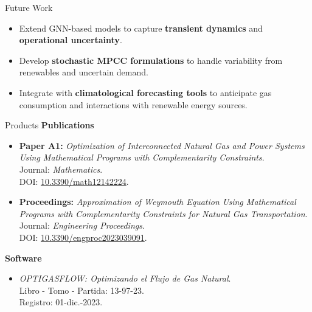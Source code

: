 \documentclass[hyperref={colorlinks,citecolor=blue,linkcolor=blue,urlcolor=blue}]{beamer}
\begin{document}
\begin{frame}{Future Work}
\begin{itemize}
    \justifying
    \item Extend GNN-based models to capture \textbf{transient dynamics} and \textbf{operational uncertainty}.
    \item Develop \textbf{stochastic MPCC formulations} to handle variability from renewables and uncertain demand.
    \item Integrate with \textbf{climatological forecasting tools} to anticipate gas consumption and interactions with renewable energy sources.
\end{itemize}
\end{frame}



\begin{frame}{Products}
\footnotesize
\textbf{Publications}
\begin{itemize}
    \item \textbf{Paper A1:} \emph{Optimization of Interconnected Natural Gas and Power Systems Using Mathematical Programs with Complementarity Constraints}.\\
    Journal: \textit{Mathematics}.\\
    DOI: \href{https://doi.org/10.3390/math12142224}{10.3390/math12142224}.
    
    \item \textbf{Proceedings:} \emph{Approximation of Weymouth Equation Using Mathematical Programs with Complementarity Constraints for Natural Gas Transportation}.\\
    Journal: \textit{Engineering Proceedings}.\\
    DOI: \href{https://doi.org/10.3390/engproc2023039091}{10.3390/engproc2023039091}.
\end{itemize}

\vspace{0.6em}

\textbf{Software}
\begin{itemize}
    \item \emph{OPTIGASFLOW: Optimizando el Flujo de Gas Natural}.\\
    Libro - Tomo - Partida: 13-97-23. \\
    Registro: 01-dic.-2023.
\end{itemize}
\end{frame}
\end{document}
